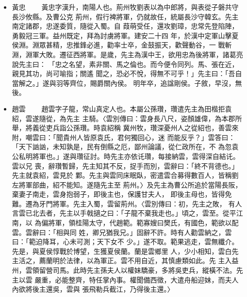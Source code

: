 \documentclass[11pt]{article}
\begin{document}
\begin{itemize}
\item 黃忠
\label{sec:orgheadline213}
　　黃忠字漢升，南陽人也。荊州牧劉表以為中郎將，與表從子磐共守長沙攸縣。及曹公克
荊州，假行裨將軍，仍就故任，統屬長沙守韓玄。先主南定諸郡，忠遂委質，隨從入蜀。自
葭萌受任，還攻劉璋，忠常先登陷陣，勇毅冠三軍。益州既定，拜為討虜將軍。建安二十四
年，於漢中定軍山擊夏侯淵。淵眾甚精，忠推鋒必進，勸率士卒，金鼓振天，歡聲動谷，一
戰斬淵，淵軍大敗。遷征西將軍。是歲，先主為漢中王，欲用忠為後將軍，諸葛亮說先主曰：
「忠之名望，素非關、馬之倫也。而今便令同列。馬、張在近，親見其功，尚可喻指；關遙
聞之，恐必不悅，得無不可乎！」先主曰：「吾自當解之。」遂與羽等齊位，賜爵關內侯。
明年卒，追諡剛侯。子敘，早沒，無後。

\item 趙雲
\label{sec:orgheadline214}
　　趙雲字子龍，常山真定人也。本屬公孫瓚，瓚遣先主為田楷拒袁紹，雲遂隨從，為先主
主騎。〈雲別傳曰：雲身長八尺，姿顏雄偉，為本郡所舉，將義從吏兵詣公孫瓚。時袁紹稱
冀州牧，瓚深憂州人之從紹也，善雲來附，嘲雲曰：「聞貴州人皆原袁氏，君何獨回心，迷
而能反乎？」雲答曰：「天下訩訩，未知孰是，民有倒縣之厄，鄙州論議，從仁政所在，不
為忽袁公私明將軍也。」遂與瓚征討。時先主亦依讬瓚，每接納雲，雲得深自結讬。雲以兄
喪，辭瓚暫歸，先主知其不反，捉手而別，雲辭曰：「終不背德也。」先主就袁紹，雲見於
鄴。先主與雲同床眠臥，密遣雲合募得數百人，皆稱劉左將軍部曲，紹不能知。遂隨先主至
荊州。〉及先主為曹公所追於當陽長阪，棄妻子南走，雲身抱弱子，即後主也，保護甘夫人，
即後主母也，皆得免難。遷為牙門將軍。先主入蜀，雲留荊州。〈雲別傳曰：初，先主之敗，
有人言雲已北去者，先主以手戟擿之曰：「子龍不棄我走也。」頃之，雲至。從平江南，以
為偏將軍，領桂陽太守，代趙範。範寡嫂曰樊氏，有國色，範欲以配雲。雲辭曰：「相與同
姓，卿兄猶我兄。」固辭不許。時有人勸雲納之，雲曰：「範迫降耳，心未可測；天下女不
少。」遂不取。範果逃走，雲無纖介。先是，與夏侯惇戰於博望，生獲夏侯蘭。蘭是雲鄉里
人，少小相知，雲白先主活之，薦蘭明於法律，以為軍正。雲不用自近，其慎慮類如此。先
主入益州，雲領留營司馬。此時先主孫夫人以權妹驕豪，多將吳吏兵，縱橫不法。先主以雲
嚴重，必能整齊，特任掌內事。權聞備西徵，大遣舟船迎妹，而夫人內欲將後主還吳，雲與
張飛勒兵截江，乃得後主還。〉


\end{itemize}
\end{document}
